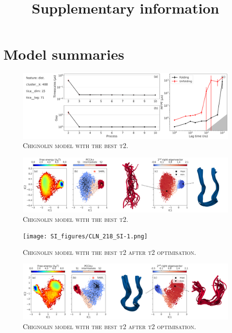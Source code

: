 \documentclass{article}
\title{Supplementary information}
\begin{document}
\maketitle


\section{Model summaries} 

\begin{figure}
    \centering
    \includegraphics[width=\columnwidth]{SI_figures/CLN_52_SI-1.png}
    \caption{\textsc{Chignolin model with the best t2.} }
    \label{si_fig:CLN_52_1}
\end{figure}

\begin{figure}
    \centering
    \includegraphics[width=\columnwidth]{SI_figures/CLN_52_SI-2.png}
    \caption{\textsc{Chignolin model with the best t2.}}
    \label{si_fig:CLN_52_2}
\end{figure}

\begin{figure}
    \centering
    \texttt{[image: SI\_figures/CLN\_218\_SI-1.png]}
    \caption{\textsc{Chignolin model with the best t2 after t2 optimisation.}}
    \label{si_fig:CLN_218_1}
\end{figure}

\begin{figure}
    \centering
    \includegraphics[width=\columnwidth]{SI_figures/CLN_218_SI-2.png}
    \caption{\textsc{Chignolin model with the best t2 after t2 optimisation.}}
    \label{si_fig:CLN_218_2}
\end{figure}
\end{document}
